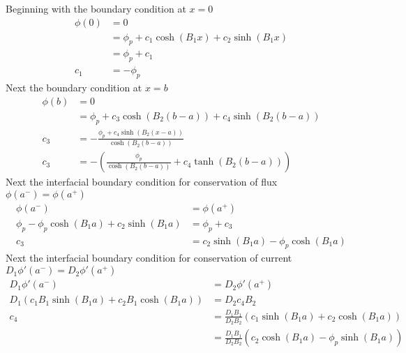 \documentclass{article}
\begin{document}
  Beginning with the boundary condition at $x=0$
  \begin{align}
    \phi(0) &= 0 \\
    &= \phi_p + c_1 \cosh(B_1 x) + c_2 \sinh(B_1 x) \\
    &= \phi_p + c_1\\
    c_1 &= -\phi_p \label{eq:bc_x0}
  \end{align}
  Next the boundary condition at $x=b$
  \begin{align}
    \phi(b) &= 0 \\
    &= \phi_p + c_3 \cosh(B_2 (b-a)) + c_4 \sinh(B_2 (b-a)) \\
    c_3 &= - \frac{\phi_p + c_4 \sinh(B_2(x-a))}{\cosh(B_2(b-a))} \\
    c_3 &= - \left(\frac{\phi_p}{\cosh(B_2(b-a))} + 
      c_4 \tanh(B_2(b-a))\right) \label{eq:bc_xb}
  \end{align}
  Next the interfacial boundary condition for conservation of flux
  $\phi(a^-)=\phi(a^+)$
  \begin{align}
    \phi(a^-) &= \phi(a^+) \\
    \phi_p - \phi_p \cosh(B_1 a) + c_2 \sinh(B_1 a) &= 
      \phi_p + c_3 \\
    c_3 &= c_2 \sinh(B_1 a) - \phi_p \cosh(B_1 a) \label{eq:bc_flux}
  \end{align}
  Next the interfacial boundary condition for conservation of current
  ${D_1 \phi'(a^-) = D_2 \phi'(a^+)}$
  \begin{align}
    D_1 \phi'(a^-) &= D_2 \phi'(a^+) \\
    D_1 (c_1 B_1 \sinh(B_1 a) + c_2 B_1 \cosh(B_1 a)) &=
      D_2 c_4 B_2 \\
    c_4 &= \frac{D_1 B_1}{D_2 B_2} (c_1 \sinh(B_1 a) + c_2 \cosh(B_1 a)) \\
    &= \frac{D_1 B_1}{D_2 B_2}(c_2 \cosh(B_1 a) - \phi_p \sinh(B_1 a))
      \label{eq:bc_current}
  \end{align}
  
\end{document}
